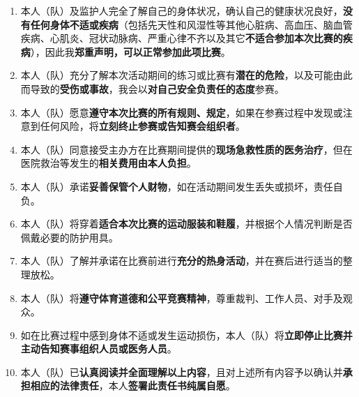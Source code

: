 \documentclass{article}
\begin{document}
\begin{enumerate} %
\item 本人（队）及监护人完全了解自己的身体状况，确认自己的健康状况良好，\textbf{没有任何身体不适或疾病}（包括先天性和风湿性等其他心脏病、高血压、脑血管疾病、心肌炎、冠状动脉病、严重心律不齐以及其它\textbf{不适合参加本次比赛的疾病}），因此我\textbf{郑重声明，可以正常参加此项比赛}。
\item 本人（队）充分了解本次活动期间的练习或比赛有\textbf{潜在的危险}，以及可能由此而导致的\textbf{受伤或事故}，我会以\textbf{对自己安全负责任的态度}参赛。
\item 本人（队）愿意\textbf{遵守本次比赛的所有规则、规定}，如果在参赛过程中发现或注意到任何风险，将\textbf{立刻终止参赛或告知赛会组织者}。
\item 本人（队）同意接受主办方在比赛期间提供的\textbf{现场急救性质的医务治疗}，但在医院救治等发生的\textbf{相关费用由本人负担}。
\item 本人（队）承诺\textbf{妥善保管个人财物}，如在活动期间发生丢失或损坏，责任自负。
\item 本人（队）将穿着\textbf{适合本次比赛的运动服装和鞋履}，并根据个人情况判断是否佩戴必要的防护用具。
\item 本人（队）了解并承诺在比赛前进行\textbf{充分的热身活动}，并在赛后进行适当的整理放松。
\item 本人（队）将\textbf{遵守体育道德和公平竞赛精神}，尊重裁判、工作人员、对手及观众。
\item 如在比赛过程中感到身体不适或发生运动损伤，本人（队）将\textbf{立即停止比赛并主动告知赛事组织人员或医务人员}。
\item 本人（队）已\textbf{认真阅读并全面理解以上内容}，且对上述所有内容予以确认并\textbf{承担相应的法律责任}，本人\textbf{签署此责任书纯属自愿}。
\end{enumerate}

\vspace{0.2cm} %
\end{document}
